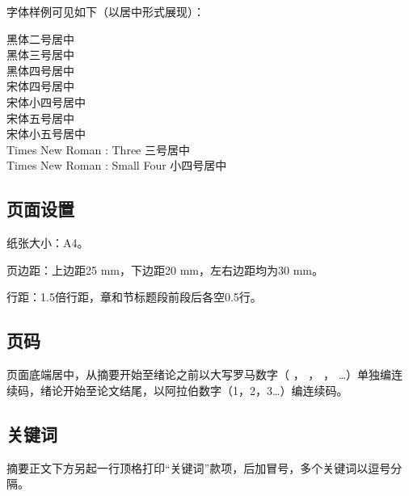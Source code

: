 字体样例可见如下（以居中形式展现）： \\

\begin{center}
    {\heiti{}黑体二号居中} \\

    {\heiti{}黑体三号居中} \\

    {\heiti{}黑体四号居中} \\

    {\songti{}宋体四号居中} \\

    {\songti{}宋体小四号居中} \\

    {\songti{}宋体五号居中} \\

    {\songti{}宋体小五号居中} \\

    { Times New Roman : Three} 三号居中 \\

    { Times New Roman : Small Four} 小四号居中 \\

\end{center}


\subsection{页面设置}

纸张大小：A4。

页边距：上边距25 mm，下边距20 mm，左右边距均为30 mm。

行距：1.5倍行距，章和节标题段前段后各空0.5行。

\subsection{页码}

页面底端居中，从摘要开始至绪论之前以大写罗马数字（
\uppercase\expandafter{} ，
\uppercase\expandafter{} ，
\uppercase\expandafter{} ，
…）单独编连续码，绪论开始至论文结尾，以阿拉伯数字（1，2，3…）编连续码。

\subsection{关键词}


摘要正文下方另起一行顶格打印``关键词''款项，后加冒号，多个关键词以逗号分隔。

